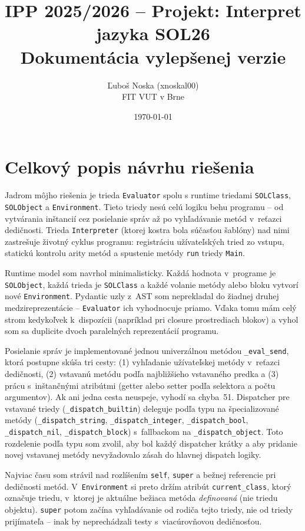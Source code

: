 \documentclass[a4paper, 11pt]{article}
\title{IPP 2025/2026 -- Projekt: Interpret jazyka SOL26 \\
\large Dokumentácia vylepšenej verzie}
\author{Ľuboš Noska (xnoskal00) \\ FIT VUT v Brne}
\date{\today}
\begin{document}
\maketitle

\section{Celkový popis návrhu riešenia}

Jadrom môjho riešenia je trieda \texttt{Evaluator} spolu s runtime triedami
\texttt{SOLClass}, \texttt{SOLObject} a \texttt{Environment}. Tieto triedy
nesú celú logiku behu programu -- od vytvárania inštancií cez posielanie
správ až po vyhľadávanie metód v~reťazci dedičnosti. Trieda \texttt{Interpreter}
(ktorej kostra bola súčasťou šablóny) nad nimi zastrešuje životný cyklus
programu: registráciu užívateľských tried zo vstupu, statickú kontrolu arity
metód a spustenie metódy \texttt{run} triedy \texttt{Main}.

Runtime model som navrhol minimalisticky. Každá hodnota v~programe je
\texttt{SOLObject}, každá trieda je \texttt{SOLClass} a každé volanie metódy
alebo bloku vytvorí nové \texttt{Environment}. Pydantic uzly z~AST som
neprekladal do žiadnej druhej medzireprezentácie -- \texttt{Evaluator} ich
vyhodnocuje priamo. Vďaka tomu mám celý strom kedykoľvek k~dispozícii
(napríklad pri closure prostrediach blokov) a vyhol som sa duplicite
dvoch paralelných reprezentácií programu.

Posielanie správ je implementované jednou univerzálnou metódou
\texttt{\_eval\_send}, ktorá postupne skúša tri cesty: (1) vyhľadanie
užívateľskej metódy v~reťazci dedičnosti, (2) vstavanú metódu podľa
najbližšieho vstavaného predka a (3) prácu s~inštančnými atribútmi
(getter alebo setter podľa selektora a počtu argumentov). Ak ani jedna cesta
neuspeje, vyhodí sa chyba~51. Dispatcher pre vstavané triedy
(\texttt{\_dispatch\_builtin}) deleguje podľa typu na špecializované metódy
(\texttt{\_dispatch\_string}, \texttt{\_dispatch\_integer},
\texttt{\_dispatch\_bool}, \texttt{\_dispatch\_nil},
\texttt{\_dispatch\_block}) s~fallbackom na \texttt{\_dispatch\_object}.
Toto rozdelenie podľa typu som zvolil, aby bol každý dispatcher krátky
a aby pridanie novej vstavanej metódy nevyžadovalo zásah do hlavnej
dispatch logiky.

Najviac času som strávil nad rozlíšením \texttt{self}, \texttt{super}
a bežnej referencie pri dedičnosti metód. V~\texttt{Environment} si preto
držím atribút \texttt{current\_class}, ktorý označuje triedu, v~ktorej je
aktuálne bežiaca metóda \emph{definovaná} (nie triedu objektu).
\texttt{super} potom začína vyhľadávanie od rodiča tejto triedy, nie od
triedy prijímateľa -- inak by neprechádzali testy s~viacúrovňovou
dedičnosťou.
\end{document}
